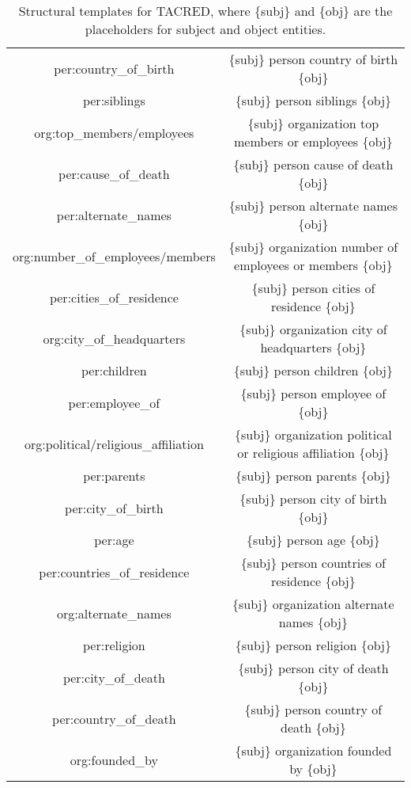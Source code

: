 \begin{table*}[h]
\begin{threeparttable}
\begin{tabular}{cc}
    per:country\_of\_birth & \{subj\} person country of birth \{obj\} \\
    per:siblings & \{subj\} person siblings \{obj\} \\
    org:top\_members/employees & \{subj\} organization top members or employees \{obj\} \\
    per:cause\_of\_death & \{subj\} person cause of death \{obj\} \\
    per:alternate\_names & \{subj\} person alternate names \{obj\} \\
    org:number\_of\_employees/members & \{subj\} organization number of employees or members \{obj\} \\
    per:cities\_of\_residence & \{subj\} person cities of residence \{obj\} \\
    org:city\_of\_headquarters & \{subj\} organization city of headquarters \{obj\} \\
    per:children & \{subj\} person children \{obj\} \\
    per:employee\_of & \{subj\} person employee of \{obj\} \\
    org:political/religious\_affiliation & \{subj\} organization political or religious affiliation \{obj\} \\
    per:parents & \{subj\} person parents \{obj\} \\
    per:city\_of\_birth & \{subj\} person city of birth \{obj\} \\
    per:age & \{subj\} person age \{obj\} \\
    per:countries\_of\_residence & \{subj\} person countries of residence \{obj\} \\
    org:alternate\_names & \{subj\} organization alternate names \{obj\} \\
    per:religion & \{subj\} person religion \{obj\} \\
    per:city\_of\_death & \{subj\} person city of death \{obj\} \\
    per:country\_of\_death & \{subj\} person country of death \{obj\} \\
    org:founded\_by & \{subj\} organization founded by \{obj\} \\
    \bottomrule
    \end{tabular}
    \end{threeparttable}
    \caption{Structural templates for TACRED, where \{subj\} and \{obj\} are the placeholders for subject and object entities.}
    \label{tab:structural-templates}
\end{table*}


